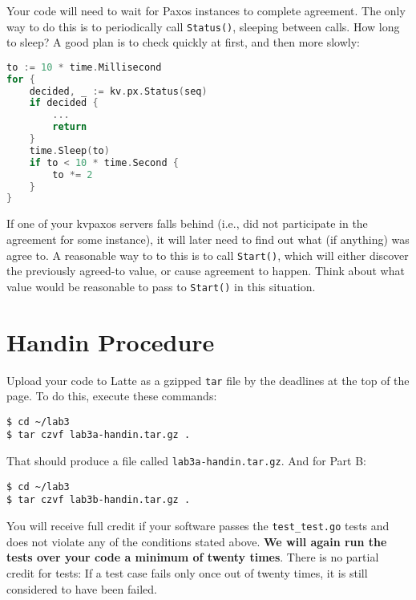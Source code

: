 \documentclass{article}
\newcommand{\code}{\texttt}
\begin{document}
Your code will need to wait for Paxos instances to complete
agreement. The only way to do this is to periodically call \code{Status()},
sleeping between calls. How long to sleep? A good plan is to check
quickly at first, and then more slowly:

\begin{lstlisting}[language=go]
to := 10 * time.Millisecond
for {
    decided, _ := kv.px.Status(seq)
    if decided {
        ...
        return
    }
    time.Sleep(to)
    if to < 10 * time.Second {
        to *= 2
    }
}
\end{lstlisting}

If one of your kvpaxos servers falls behind (i.e., did not participate
in the agreement for some instance), it will later need to find out what (if
anything) was agree to. A reasonable way to to this is to call \code{Start()},
which will either discover the previously agreed-to value, or cause
agreement to happen. Think about what value would be reasonable to
pass to \code{Start()} in this situation.


\section{Handin Procedure}
Upload your code to Latte as a gzipped \code{tar} file by the deadlines at the top of the page. To do this, execute these commands: 
\begin{lstlisting}
$ cd ~/lab3 
$ tar czvf lab3a-handin.tar.gz . 
\end{lstlisting}
That should produce a file called \code{lab3a-handin.tar.gz}. And for Part B: 
\begin{lstlisting}
$ cd ~/lab3 
$ tar czvf lab3b-handin.tar.gz . 
\end{lstlisting}
You will receive full credit if your software passes the \code{test\_test.go} tests and does not violate any of the conditions stated above. \textbf{We will again run the tests over your code a minimum of twenty times}. There is no partial credit for tests: If a test case fails only once out of twenty times, it is still considered to have been failed. 
\end{document}
